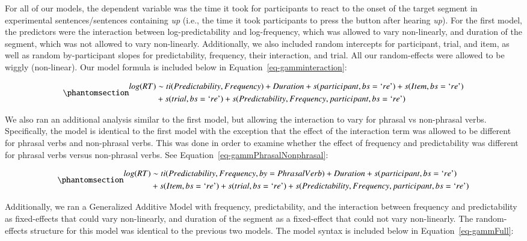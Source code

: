 \documentclass[
  authoryear,
  preprint,
  1p,
  onecolumn]{elsarticle}
\begin{document}
For all of our models, the dependent variable was the time it took for
participants to react to the onset of the target segment in experimental
sentences/sentences containing \emph{up} (i.e., the time it took
participants to press the button after hearing \emph{up}). For the first
model, the predictors were the interaction between log-predictability
and log-frequency, which was allowed to vary non-linearly, and duration
of the segment, which was not allowed to vary non-linearly.
Additionally, we also included random intercepts for participant, trial,
and item, as well as random by-participant slopes for predictability,
frequency, their interaction, and trial. All our random-effects were
allowed to be wiggly (non-linear). Our model formula is included below
in Equation~\ref{eq-gamminteraction}:

\begin{equation}\phantomsection\label{eq-gamminteraction}{
\begin{aligned}log(RT) & \sim ti(Predictability, Frequency) + Duration + s(participant, bs = \text{`}re\text{'}) + s(Item, bs = \text{`}re\text{'}) \\& + s(trial, bs = \text{`}re\text{'}) + s(Predictability, Frequency, participant, bs = \text{`}re\text{'}) \end{aligned}
}\end{equation}

We also ran an additional analysis similar to the first model, but
allowing the interaction to vary for phrasal vs non-phrasal verbs.
Specifically, the model is identical to the first model with the
exception that the effect of the interaction term was allowed to be
different for phrasal verbs and non-phrasal verbs. This was done in
order to examine whether the effect of frequency and predictability was
different for phrasal verbs versus non-phrasal verbs. See
Equation~\ref{eq-gammPhrasalNonphrasal}:

\begin{equation}\phantomsection\label{eq-gammPhrasalNonphrasal}{
\begin{aligned}
log(RT) & \sim ti(Predictability, Frequency, by = PhrasalVerb) + Duration + s(participant, bs = \text{`}re\text{'}) \\ & + s(Item, bs = \text{`}re\text{'}) + s(trial, bs = \text{`}re\text{'}) + s(Predictability, Frequency, participant, bs = \text{`}re\text{'}) 
\end{aligned}
}\end{equation}

Additionally, we ran a Generalized Additive Model with frequency,
predictability, and the interaction between frequency and predictability
as fixed-effects that could vary non-linearly, and duration of the
segment as a fixed-effect that could not vary non-linearly. The
random-effects structure for this model was identical to the previous
two models. The model syntax is included below in
Equation~\ref{eq-gammFull}:
\end{document}
